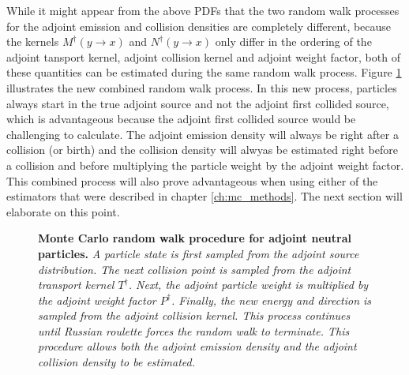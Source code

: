 While it might appear from the above PDFs that the two random walk processes
for the adjoint emission and collision densities are completely different,
because the kernels $M^{\dagger}(y \to x)$ and $N^{\dagger}(y \to x)$ only differ
in the ordering of the adjoint tansport kernel, adjoint collision kernel and 
adjoint weight factor, both of these quantities can be estimated during the
same random walk process. Figure \ref{fig:combined_adj_random_walk_process}
illustrates the new combined random walk process. In this new process, 
particles always start in the true adjoint source and not the adjoint first
collided source, which is advantageous because the adjoint first collided 
source would be challenging to calculate. The adjoint emission density will
always be right after a collision (or birth) and the collision density will
alwyas be estimated right before a collision and before multiplying the particle
weight by the adjoint weight factor. This combined process will also prove
advantageous when using either of the estimators that were described in chapter
\ref{ch:mc_methods}. The next section will elaborate on this point.
\begin{figure}[t!]
  \begin{center}
    \end{center}
  \caption{\textbf{Monte Carlo random walk procedure for adjoint neutral particles.}
    \textit{A particle state is first sampled from the adjoint source 
      distribution. The next collision point is sampled from the adjoint 
      transport kernel $T^{\dagger}$. Next, the adjoint particle weight is
      multiplied by the adjoint weight factor $P^{\dagger}$. Finally, the new 
      energy and direction is sampled from the adjoint collision kernel. This
      process continues until Russian roulette forces the random walk to
      terminate. This procedure allows both the adjoint emission density and 
      the adjoint collision density to be estimated.}}
  \label{fig:combined_adj_random_walk_process}
\end{figure}

